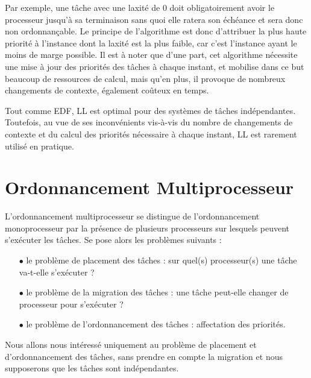 Par exemple, une tâche avec une laxité de 0 doit obligatoirement avoir le processeur jusqu'à sa terminaison sans quoi elle ratera son échéance et sera donc non ordonnançable.
Le principe de l'algorithme est donc d'attribuer la plus haute priorité à l'instance dont la laxité est la plus faible, car c'est l'instance ayant le moins de marge possible. 
Il est à noter que d'une part, cet algorithme nécessite une mise à jour des priorités des tâches à chaque instant, et mobilise dans ce but beaucoup de ressources de calcul, 
mais qu'en plus, il provoque de nombreux changements de contexte, également coûteux en temps.
\begin{theoreme}
Tout comme EDF, LL est optimal pour des systèmes de tâches indépendantes. Toutefois, au vue de ses inconvénients vis-à-vis du nombre de changements de contexte et du calcul 
des priorités nécessaire à chaque instant, LL est rarement utilisé en pratique.
\end{theoreme}

\section{Ordonnancement Multiprocesseur}
\vspace{-1cm}
L'ordonnancement multiprocesseur se distingue de l'ordonnancement monoprocesseur par la présence de plusieurs processeurs sur lesquels peuvent s'exécuter les tâches. Se pose alors les problèmes suivants :
\begin{itemize}
\item[$\bullet$] le problème de placement des tâches : sur quel(s) processeur(s) une tâche va-t-elle s'exécuter ?
\item[$\bullet$] le problème de la migration des tâches : une tâche peut-elle changer de processeur pour s'exécuter ?
\item[$\bullet$] le problème de l'ordonnancement des tâches : affectation des priorités.
\end{itemize}

Nous allons nous intéressé uniquement au problème de placement et d'ordonnancement des tâches, sans prendre en compte la migration et nous supposerons que les tâches sont indépendantes.

